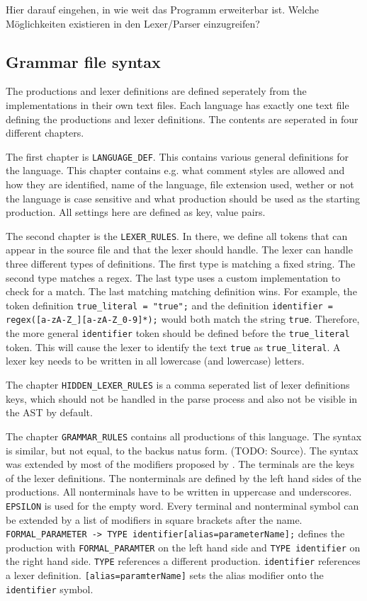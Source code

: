 Hier darauf eingehen, in wie weit das Programm erweiterbar ist. Welche Möglichkeiten existieren in den Lexer/Parser einzugreifen?

\subsection{Grammar file syntax}

The productions and lexer definitions are defined seperately from the implementations in their own text files. Each language has exactly one text file defining the productions and lexer definitions. The contents are seperated in four different chapters.

The first chapter is \verb|LANGUAGE_DEF|. This contains various general definitions for the language. This chapter contains e.g. what comment styles are allowed and how they are identified, name of the language, file extension used, wether or not the language is case sensitive and what production should be used as the starting production. All settings here are defined as key, value pairs.

The second chapter is the \verb|LEXER_RULES|. In there, we define all tokens that can appear in the source file and that the lexer should handle. The lexer can handle three different types of definitions. The first type is matching a fixed string. The second type matches a regex. The last type uses a custom implementation to check for a match. The last matching matching definition wins. For example, the token definition \verb|true_literal = "true";| and the definition \verb|identifier = regex([a-zA-Z_][a-zA-Z_0-9]*);| would both match the string \verb|true|. Therefore, the more general \verb|identifier| token should be defined before the \verb|true_literal| token. This will cause the lexer to identify the text \verb|true| as \verb|true_literal|. A lexer key needs to be written in all lowercase (and lowercase) letters.

The chapter \verb|HIDDEN_LEXER_RULES| is a comma seperated list of lexer definitions keys, which should not be handled in the parse process and also not be visible in the AST by default. 

The chapter \verb|GRAMMAR_RULES| contains all productions of this language. The syntax is similar, but not equal, to the backus natus form. (TODO: Source). The syntax was extended by most of the modifiers proposed by \cite{GeneratingRewritableAST}. The terminals are the keys of the lexer definitions. The nonterminals are defined by the left hand sides of the productions. All nonterminals have to be written in uppercase and underscores. \verb|EPSILON| is used for the empty word. Every terminal and nonterminal symbol can be extended by a list of modifiers in square brackets after the name. \verb|FORMAL_PARAMETER -> TYPE identifier[alias=parameterName];| defines the production with \verb|FORMAL_PARAMTER| on the left hand side and \verb|TYPE identifier| on the right hand side. \verb|TYPE| references a different production. \verb|identifier| references a lexer definition. \verb|[alias=paramterName]| sets the alias modifier onto the \verb|identifier| symbol.

